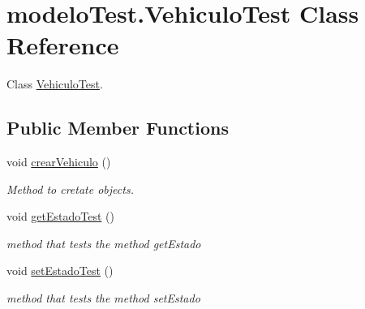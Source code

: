 \hypertarget{classmodelo_test_1_1_vehiculo_test}{}\section{modelo\+Test.\+Vehiculo\+Test Class Reference}
\label{classmodelo_test_1_1_vehiculo_test}


Class \mbox{\hyperlink{classmodelo_test_1_1_vehiculo_test}{Vehiculo\+Test}}.  


\subsection*{Public Member Functions}
\begin{DoxyCompactItemize}
\item 
\mbox{\label{classmodelo_test_1_1_vehiculo_test_a698cc1dae515c04ec88bad63a195354e}} 
void \mbox{\hyperlink{classmodelo_test_1_1_vehiculo_test_a698cc1dae515c04ec88bad63a195354e}{crear\+Vehiculo}} ()
\begin{DoxyCompactList}\small\item\em Method to cretate objects. \end{DoxyCompactList}\item 
\mbox{\label{classmodelo_test_1_1_vehiculo_test_a34b5a2b03801fa7b028232cd6617ee40}} 
void \mbox{\hyperlink{classmodelo_test_1_1_vehiculo_test_a34b5a2b03801fa7b028232cd6617ee40}{get\+Estado\+Test}} ()
\begin{DoxyCompactList}\small\item\em method that tests the method get\+Estado \end{DoxyCompactList}\item 
\mbox{\label{classmodelo_test_1_1_vehiculo_test_abd28845734d433a1e84055e766d8e447}} 
void \mbox{\hyperlink{classmodelo_test_1_1_vehiculo_test_abd28845734d433a1e84055e766d8e447}{set\+Estado\+Test}} ()
\begin{DoxyCompactList}\small\item\em method that tests the method set\+Estado \end{DoxyCompactList}\item 
\mbox{\label{classmodelo_test_1_1_vehiculo_test_a91fdc067b1a488b2c9daa231ac13c8a5}} 

\end{DoxyCompactItemize}
